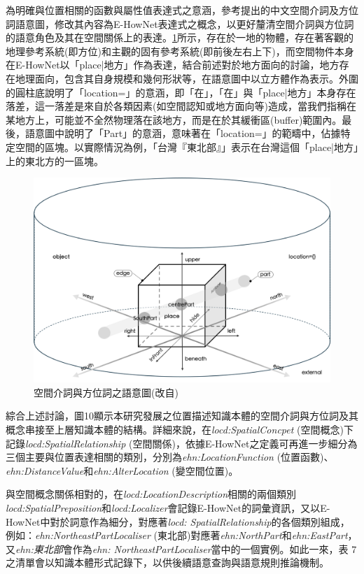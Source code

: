 為明確與位置相關的函數與屬性值表達式之意涵，參考\citet{RN45}提出的中文空間介詞及方位詞語意圖，修改其內容為E-HowNet表達式之概念，以更好釐清空間介詞與方位詞的語意角色及其在空間關係上的表達。\ref{fig:spatialpreposition}所示，存在於一地的物體，存在著客觀的地理參考系統(即方位)和主觀的固有參考系統(即前後左右上下)，而空間物件本身在E-HowNet以「place|地方」作為表達，結合前述對於地方面向的討論，地方存在地理面向，包含其自身規模和幾何形狀等，在語意圖中以立方體作為表示。外圍的圓柱底說明了「location={}」的意涵，即「在」，「在」與「place|地方」本身存在落差，這一落差是來自於各類因素(如空間認知或地方面向等)造成，當我們指稱在某地方上，可能並不全然物理落在該地方，而是在於其緩衝區(buffer)範圍內。最後，語意圖中說明了「Part」的意涵，意味著在「location={}」的範疇中，佔據特定空間的區塊。以實際情況為例，「台灣『東北部』」表示在台灣這個「place|地方」上的東北方的一區塊。

\begin{figure}[!htbp]
\centering
\includegraphics[width = \textwidth]{figures/spatialpreposition.png}
\caption{空間介詞與方位詞之語意圖(改自\citet{RN45})}
\label{fig:spatialpreposition}
\end{figure}



綜合上述討論，圖10顯示本研究發展之位置描述知識本體的空間介詞與方位詞及其概念串接至上層知識本體的結構。詳細來說，在\textit{locd:SpatialConcpet} (空間概念)下記錄\textit{locd:SpatialRelationship} (空間關係)，依據E-HowNet之定義可再進一步細分為三個主要與位置表達相關的類別，分別為\textit{ehn:LocationFunction} (位置函數)、\textit{ehn:DistanceValue}和\textit{ehn:AlterLocation} (變空間位置)。

與空間概念關係相對的，在\textit{locd:LocationDescription}相關的兩個類別\textit{locd:SpatialPreposition}和\textit{locd:Localizer}會記錄E-HowNet的詞彙資訊，又以E-HowNet中對於詞意作為細分，對應著\textit{locd: SpatialRelationship}的各個類別組成，例如：\textit{ehn:NortheastPartLocaliser} (東北部)對應著\textit{ehn:NorthPart}和\textit{ehn:EastPart}，又\textit{ehn:東北部}會作為\textit{ehn: NortheastPartLocaliser}當中的一個實例。如此一來，表 7之清單會以知識本體形式記錄下，以供後續語意查詢與語意規則推論機制。

